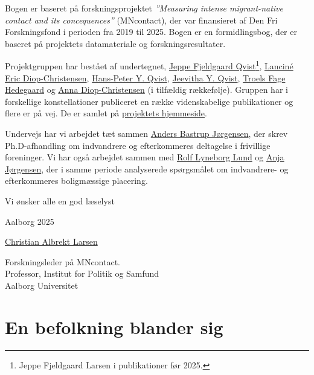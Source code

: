 \documentclass[
]{book}
\begin{document}
\thispagestyle{empty}

Bogen er baseret på forskningsprojektet \emph{''Measuring intense migrant-native contact and its concequences''} (MNcontact), der var finansieret af Den Fri Forskningsfond i perioden fra 2019 til 2025. Bogen er en formidlingsbog, der er baseret på projektets datamateriale og forskningsresultater.

Projektgruppen har bestået af undertegnet, \href{https://vbn.aau.dk/da/persons/jeppefl}{Jeppe Fjeldgaard Qvist}\footnote{Jeppe Fjeldgaard Larsen i publikationer før 2025.}, \href{https://vbn.aau.dk/en/persons/led}{Lanciné Eric Diop-Christensen}, \href{https://vbn.aau.dk/da/persons/hpq}{Hans-Peter Y. Qvist}, \href{https://vbn.aau.dk/en/persons/jy}{Jeevitha Y. Qvist}, \href{https://vbn.aau.dk/en/persons/troelsfh}{Troels Fage Hedegaard} og \href{https://dk.linkedin.com/in/anna-diop-christensen-58b5ba282}{Anna Diop-Christensen} (i tilfældig rækkefølje). Gruppen har i forskellige konstellationer publiceret en række videnskabelige publikationer og flere er på vej. De er samlet på \href{https://vbn.aau.dk/en/projects/measuring-intense-migrant-native-contact-and-its-consequences/publications/}{projektets hjemmeside}.

Undervejs har vi arbejdet tæt sammen \href{https://vbn.aau.dk/en/persons/anbajo}{Anders Bastrup Jørgensen}, der skrev Ph.D-afhandling om indvandrere og efterkommeres deltagelse i frivillige foreninger. Vi har også arbejdet sammen med \href{https://vbn.aau.dk/en/persons/rolfll}{Rolf Lyneborg Lund} og \href{https://vbn.aau.dk/en/persons/anjaj}{Anja Jørgensen}, der i samme periode analyserede spørgsmålet om indvandrere- og efterkommeres boligmæssige placering.

Vi ønsker alle en god læselyst

Aalborg 2025

\href{https://vbn.aau.dk/en/persons/albrekt}{Christian Albrekt Larsen}

Forskningsleder på MNcontact.\\
Professor, Institut for Politik og Samfund\\
Aalborg Universitet\\

\newpage

\tableofcontents

\clearpage
\pagestyle{fancy}

\chapter{En befolkning blander sig}\label{kap1}
\end{document}
